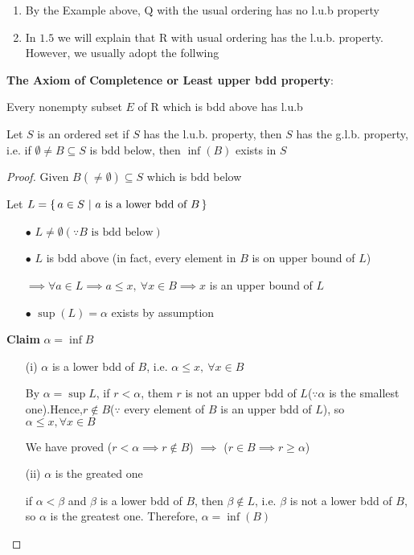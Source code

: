 \begin{rmk*}$ $
	\begin{enumerate}
		\item By the Example above, $\mathrm{Q}$ with the usual ordering has no l.u.b property
		\item In $1.5$ we will explain that $\mathrm{R}$ with usual ordering has the l.u.b. property.
		However, we usually adopt the follwing
	\end{enumerate}
\end{rmk*}

\textbf{The Axiom of Completence or Least upper bdd property}:

Every nonempty subset $E$ of $\mathrm{R}$ which is bdd above has l.u.b

\begin{thm*}
	Let $S$ is an ordered set if $S$ has the l.u.b. property, then $S$ has the g.l.b. property, i.e. if $\emptyset \neq B \subseteq S$ is bdd below, then $\inf (B)$ exists in $S$ 
\end{thm*}

\begin{proof}
	Given $B(\neq \emptyset) \subseteq S$ which is bdd below
	
	Let $L = \left\{ \,a \in S ~|~ a \text{ is a lower bdd of }B \,\right\}$
	
	\begin{enumerate}
		\item[$\bullet$] $L \neq \emptyset(\because B\text{ is bdd below})$
		\item[$\bullet$] $L$ is bdd above (in fact, every element in $B$ is on upper bound of $L$)
		
		$\implies \forall a \in L \implies a \leq x ,~\forall x \in B \implies x$ is an upper bound of $L$ 
		\item[$\bullet$] $\sup (L) = \alpha$ exists by assumption
		
	\end{enumerate}
	
	\textbf{Claim} $\alpha = \inf B$
	
	\begin{enumerate}
		\item[(i)] $\alpha$ is a lower bdd of $B$, i.e. $\alpha \leq x,~\forall x \in B$
		
		By $\alpha = \sup L$, if $r < \alpha$, them $r$ is not an upper bdd of $L$($\because \alpha$ is the smallest one).Hence,$r \notin B$($\because$ every element of $B$ is an upper bdd of $L$), so $\alpha \leq x, \forall x \in B$ 
		
		We have proved ($r<\alpha \implies r \notin B$) $\implies$ ($r\in B \implies r \geq \alpha$)
		\item[(ii)] $\alpha$ is the greated one
		
		if $\alpha < \beta$ and $\beta$ is a lower bdd of $B$, then $\beta \notin L$, i.e. $\beta$ is not a lower bdd of $B$, so $\alpha$ is the greatest one. Therefore, $\alpha = \inf (B)$
	\end{enumerate}
	
\end{proof}

